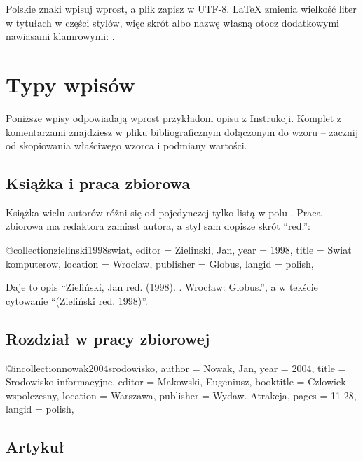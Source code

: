 Polskie znaki wpisuj wprost, a plik zapisz w UTF-8. LaTeX zmienia wielkość liter w tytułach w części stylów, więc skrót albo nazwę własną otocz dodatkowymi nawiasami klamrowymi: .

\section{Typy wpisów}

Poniższe wpisy odpowiadają wprost przykładom opisu z Instrukcji. Komplet z komentarzami znajdziesz w pliku bibliograficznym dołączonym do wzoru -- zacznij od skopiowania właściwego wzorca i podmiany wartości.

\subsection{Książka i praca zbiorowa}

Książka wielu autorów różni się od pojedynczej tylko listą w polu . Praca zbiorowa ma redaktora zamiast autora, a styl sam dopisze skrót \enquote{red.}:

\begin{zapis}
@collection{zielinski1998swiat,
  editor    = {Zielinski, Jan},
  year      = {1998},
  title     = {Swiat komputerow},
  location  = {Wroclaw},
  publisher = {Globus},
  langid    = {polish},
}
\end{zapis}

Daje to opis \enquote{Zieliński, Jan red. (1998). . Wrocław: Globus.}, a w tekście cytowanie \enquote{(Zieliński red. 1998)}.

\subsection{Rozdział w pracy zbiorowej}

\begin{zapis}
@incollection{nowak2004srodowisko,
  author    = {Nowak, Jan},
  year      = {2004},
  title     = {Srodowisko informacyjne},
  editor    = {Makowski, Eugeniusz},
  booktitle = {Czlowiek wspolczesny},
  location  = {Warszawa},
  publisher = {Wydaw. Atrakcja},
  pages     = {11-28},
  langid    = {polish},
}
\end{zapis}

\subsection{Artykuł}

